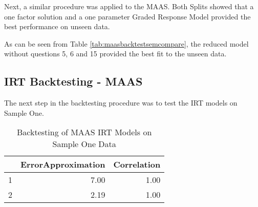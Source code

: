 \documentclass{article}
\begin{document}
Next,  a similar procedure was applied to the MAAS. Both Splits showed that a one factor solution and a one parameter Graded Response Model provided the best performance on unseen data. 





\begin{table}[ht]
\centering
{}
\caption{Full and Reduced Models for MAAS Tested on Sample One Data} 
\label{tab:maasbacktestsemcompare}
\end{table}
As can be seen from Table \ref{tab:maasbacktestsemcompare}, the reduced model without questions 5, 6 and 15  provided the best fit to the unseen data. 



\subsection{IRT Backtesting - MAAS}
\label{sec:irt-backtesting-maas}

The next step in the backtesting procedure was to test the IRT models on Sample One. 



\begin{table}[ht]
\centering
\begin{tabular}{rrr}
  \hline
 & ErrorApproximation & Correlation \\ 
  \hline
1 & 7.00 & 1.00 \\ 
  2 & 2.19 & 1.00 \\ 
   \hline
\end{tabular}
\caption{Backtesting of MAAS IRT Models on Sample One Data} 
\label{tab:maasbtgrmtest}
\end{table}
\end{document}
